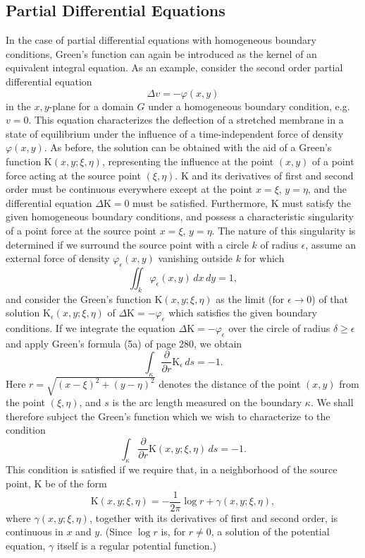 \subsection{Partial Differential Equations}
In the case of partial differential equations with homogeneous boundary conditions, Green's function can again be introduced as the kernel of an equivalent integral equation. As an example, consider the second order partial differential equation
\[
\Delta v=-\varphi(x,y)
\]
in the $x,y$-plane for a domain $G$ under a homogeneous boundary condition, e.g. $v=0$. This equation characterizes the deflection of a stretched membrane in a state of equilibrium under the influence of a time-independent force of density $\varphi(x,y)$. As before, the solution can be obtained with the aid of a Green's function $\mathrm K(x,y;\xi,\eta)$, representing the influence at the point $(x,y)$ of a point force acting at the source point $(\xi,\eta)$. $\mathrm K$ and its derivatives of first and second order must be continuous everywhere except at the point $x=\xi$, $y=\eta$, and the differential equation $\Delta\mathrm K=0$ must be satisfied. Furthermore, $\mathrm K$ must satisfy the given homogeneous boundary conditions, and possess a characteristic singularity of a point force at the source point $x=\xi$, $y=\eta$. The nature of this singularity is determined if we surround the source point with a circle $k$ of radius $\epsilon$, assume an external force of density $\varphi_\epsilon(x,y)$ vanishing outside $k$ for which
\[
\iint_k\varphi_\epsilon(x,y)\,dx\,dy=1,
\]
and consider the Green's function $\mathrm K(x,y;\xi,\eta)$ as the limit (for $\epsilon\to0$) of that solution $\mathrm K_\epsilon(x,y;\xi,\eta)$ of $\Delta\mathrm K=-\varphi_\epsilon$ which satisfies the given boundary conditions. If we integrate the equation $\Delta\mathrm K=-\varphi_\epsilon$ over the circle of radius $\delta\ge\epsilon$ and apply Green's formula (5a) of page 280, we obtain
\[
\int_\kappa\frac{\partial}{\partial r}\mathrm K_\epsilon\,ds=-1.
\]
Here $r=\sqrt{(x-\xi)^2+(y-\eta)^2}$ denotes the distance of the point $(x,y)$ from the point $(\xi,\eta)$, and $s$ is the arc length measured on the boundary $\kappa$. We shall therefore subject the Green's function which we wish to characterize to the condition
\[
\int_\kappa\frac{\partial}{\partial r}\mathrm K(x,y;\xi,\eta)\,ds=-1.
\]
This condition is satisfied if we require that, in a neighborhood of the source point, $\mathrm K$ be of the form
\[
\mathrm K(x,y;\xi,\eta)=-\frac1{2\pi}\log r+\gamma(x,y;\xi,\eta),
\]
where $\gamma(x,y;\xi,\eta)$, together with its derivatives of first and second order, is continuous in $x$ and $y$. (Since $\log r$ is, for $r\ne0$, a solution of the potential equation, $\gamma$ itself is a regular potential function.)

